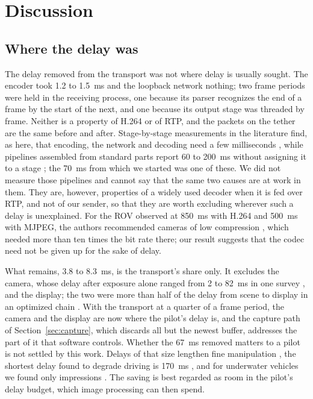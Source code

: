 \section{Discussion}\label{sec:discussion}

\subsection{Where the delay was}

The delay removed from the transport was not where delay is usually sought. The
encoder took 1.2 to 1.5~ms and the loopback network nothing; two
frame periods were
held in the receiving process, one because its parser recognizes the
end of a frame
by the start of the next, and one because its output stage was
threaded by frame.
Neither is a property of H.264 or of RTP, and the packets on the
tether are the same
before and after. Stage-by-stage measurements in the literature find,
as here, that
encoding, the network and decoding need a few milliseconds
\cite{bachhuber2018,lv2026,georg2020}, while pipelines assembled from
standard parts
report 60 to 200~ms without assigning it to a stage
\cite{green2021,khalil2026,schimpe2022,testouri2025}; the 70~ms from
which we started
was one of these. We did not measure those pipelines and cannot say
that the same two
causes are at work in them. They are, however, properties of a widely
used decoder
when it is fed over RTP, and not of our sender, so that they are worth excluding
wherever such a delay is unexplained. For the ROV observed at 850~ms
with H.264 and
500~ms with MJPEG, the authors recommended cameras of low compression
\cite{kaknjo2018}, which needed more than ten times the bit rate
there; our result
suggests that the codec need not be given up for the sake of delay.

What remains, 3.8 to 8.3~ms, is the transport's share only. It
excludes the camera,
whose delay after exposure alone ranged from 2 to 82~ms in one survey
\cite{ubik2021}, and the display; the two were more than half of the
delay from scene
to display in an optimized chain \cite{bachhuber2018}. With the transport at a
quarter of a frame period, the camera and the display are now where the pilot's
delay is, and the capture path of Section~\ref{sec:capture}, which
discards all but
the newest buffer, addresses the part of it that software controls. Whether the
67~ms removed matters to a pilot is not settled by this work. Delays
of that size
lengthen fine manipulation \cite{mackenzie1993,nankaku2022}, the
shortest delay found
to degrade driving is 170~ms \cite{chen2007}, and for underwater
vehicles we found
only impressions \cite{bauer2025,doniec2010}. The saving is best
regarded as room in
the pilot's delay budget, which image processing can then spend.

